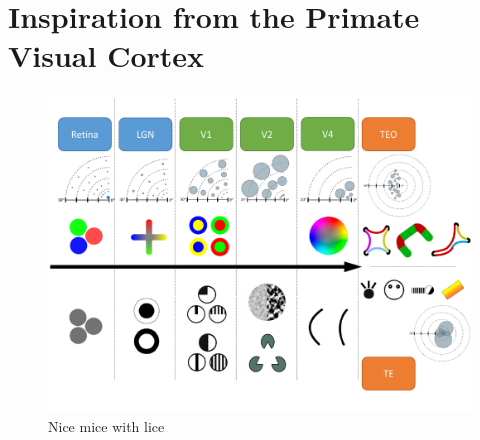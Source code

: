 \section{Inspiration from the Primate Visual Cortex}
\label{sec:pvc}

\begin{figure}[h!]
\centering
\includegraphics[width=1.0\textwidth]{graphics/pvc_figure1}
\caption{Nice mice with lice}
\label{fig:pcv1}
\end{figure}